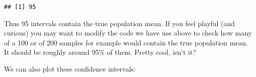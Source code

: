 \documentclass[]{book}
\newenvironment{Shaded}{\begin{snugshade}}{\end{snugshade}}
\newcommand{\KeywordTok}[1]{\textcolor[rgb]{0.13,0.29,0.53}{\textbf{#1}}}
\newcommand{\NormalTok}[1]{#1}
\newcommand{\OperatorTok}[1]{\textcolor[rgb]{0.81,0.36,0.00}{\textbf{#1}}}
\newcommand{\StringTok}[1]{\textcolor[rgb]{0.31,0.60,0.02}{#1}}
\theoremstyle{definition}
\theoremstyle{definition}
\theoremstyle{definition}
\theoremstyle{remark}
\begin{document}
\begin{Shaded}
\end{Shaded}

\begin{verbatim}
## [1] 95
\end{verbatim}

Thus 95 intervals contain the true population mean. If you feel playful
(and curious) you may want to modify the code we have use above to check
how many of a 100 or of 200 samples for example would contain the true
population mean. It should be roughly around 95\% of them. Pretty cool,
isn't it?

We can also plot these confidence intervals:
\end{document}
